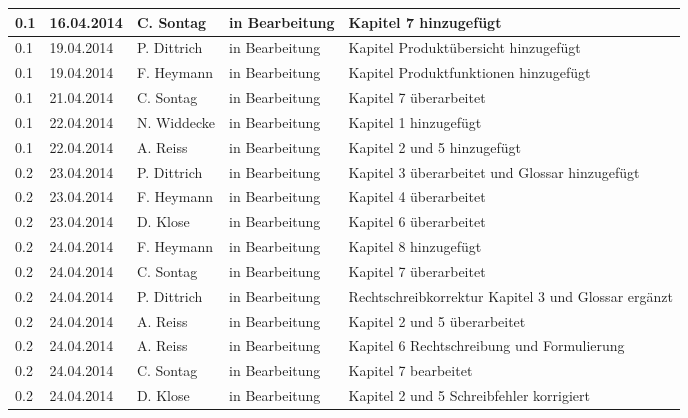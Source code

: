 \begin{longtable}{|m{1.78cm}|m{1.59cm}|m{2.86cm}|m{1.9cm}|m{5.25cm}|}
  0.1    &    16.04.2014    &    C. Sontag    &    in Bearbeitung    &   
  Kapitel 7 hinzugefügt\\
  \hline
  0.1    &    19.04.2014    &    P. Dittrich   &    in Bearbeitung    &   
  Kapitel Produktübersicht hinzugefügt\\
  \hline
  0.1    &    19.04.2014    &    F. Heymann   &    in Bearbeitung    &   
  Kapitel Produktfunktionen hinzugefügt\\
  \hline      
  0.1    &    21.04.2014    &    C. Sontag   &    in Bearbeitung    &   
  Kapitel 7 überarbeitet\\
	\hline
  0.1    &    22.04.2014    &    N. Widdecke   &    in Bearbeitung    &   
  Kapitel 1 hinzugefügt\\  
  \hline 
	0.1    &    22.04.2014    &    A. Reiss   &    in Bearbeitung    &   
  Kapitel 2 und 5 hinzugefügt\\  
  \hline   
    0.2    &    23.04.2014    &    P. Dittrich   &    in Bearbeitung    &   
  Kapitel 3 überarbeitet und Glossar hinzugefügt\\  
  \hline 
  0.2    &    23.04.2014    &   F. Heymann   &    in Bearbeitung    &   
  Kapitel 4 überarbeitet\\  
  \hline 
  0.2    &    23.04.2014    &   D. Klose   &    in Bearbeitung    &   
  Kapitel 6 überarbeitet\\  
  \hline        
  0.2    &    24.04.2014    &   F. Heymann   &    in Bearbeitung    &   
  Kapitel 8 hinzugefügt\\  
  \hline  
  0.2    &    24.04.2014    &   C. Sontag   &    in Bearbeitung    &   
  Kapitel 7 überarbeitet\\  
  \hline
  0.2    &    24.04.2014    &   P. Dittrich   &    in Bearbeitung    &   
  Rechtschreibkorrektur Kapitel 3 und Glossar ergänzt\\
  \hline 
	0.2    &    24.04.2014    &   A. Reiss   &    in Bearbeitung    &   
  Kapitel 2 und 5 überarbeitet\\  
  \hline
	0.2    &    24.04.2014    &   A. Reiss   &    in Bearbeitung    &   
  Kapitel 6 Rechtschreibung und Formulierung\\  
  \hline
  	0.2    &    24.04.2014    &   C. Sontag   &    in Bearbeitung    &   
  Kapitel 7 bearbeitet\\  
  \hline
  0.2    &    24.04.2014    &   D. Klose   &    in Bearbeitung    &   
   Kapitel 2 und 5 Schreibfehler korrigiert\\  

\end{longtable}

